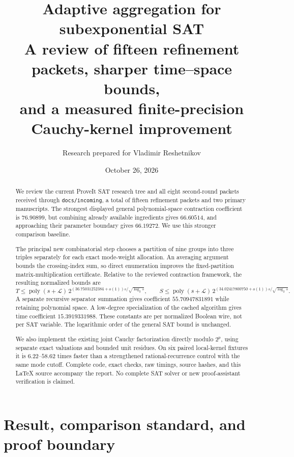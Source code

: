 \documentclass[11pt]{article}
\title{\textbf{Adaptive aggregation for subexponential SAT}\\[5pt]\large A review of fifteen refinement packets, sharper time--space bounds,\\and a measured finite-precision Cauchy-kernel improvement}
\author{Research prepared for Vladimir Reshetnikov}
\date{October 26, 2026}
\theoremstyle{definition}\newtheorem{definition}[theorem]{Definition}
\theoremstyle{remark}\newtheorem{remark}[theorem]{Remark}
\newcommand{\poly}{\operatorname{poly}}
\begin{document}
\maketitle
\begin{abstract}
We review the current ProveIt SAT research tree and all eight second-round packets
received through \texttt{docs/incoming}, a total of fifteen refinement packets and two primary
manuscripts. The strongest displayed general polynomial-space contraction
coefficient is $76.90899$, but combining already available ingredients gives
$66.60514$, and approaching their parameter boundary gives $66.19272$.
We use this stronger comparison baseline.

The principal new combinatorial step chooses a partition of nine groups into
three triples separately for each exact mode-weight allocation. An averaging
argument bounds the crossing-index sum, so direct enumeration improves the
fixed-partition matrix-multiplication certificate. Relative to the reviewed
contraction framework, the resulting normalized bounds are
\[
 T\le\poly(s+\mathcal L)\,
 2^{(36.75031252384+o(1))s/\sqrt{\log_2s}},\qquad
 S\le\poly(s+\mathcal L)\,
 2^{(34.02417800750+o(1))s/\sqrt{\log_2s}}.
\]
A separate recursive separator summation gives coefficient $55.70947831891$
while retaining polynomial space. A low-degree specialization of the cached
algorithm gives time coefficient $15.3919331988$. These constants are per normalized Boolean wire,
not per SAT variable. The logarithmic order of the general SAT bound is unchanged.

We also implement the existing joint Cauchy factorization directly modulo
$2^p$, using separate exact valuations and bounded unit residues. On six
paired local-kernel fixtures it is $6.22$--$58.62$ times faster than a
strengthened rational-recurrence control with the same mode cutoff. Complete
code, exact checks, raw timings, source hashes, and this LaTeX source accompany
the report. No complete SAT solver or new proof-assistant verification is claimed.
\end{abstract}
\clearpage
\begingroup
\setlength{\parskip}{0pt}
\tableofcontents
\endgroup
\clearpage

\section{Result, comparison standard, and proof boundary}
\label{sec:result}
\end{document}
